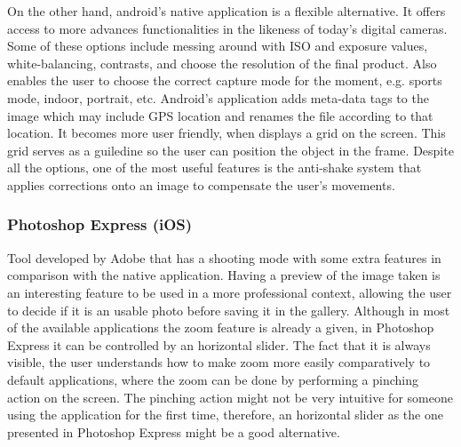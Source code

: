 On the other hand, android's native application is a flexible alternative. It offers access to more advances functionalities in the likeness of today's digital cameras.
Some of these options include messing around with ISO and exposure values, white-balancing, contrasts, and choose the resolution of the final product. Also enables the user to choose the correct capture mode for the moment, e.g. sports mode, indoor, portrait, etc.
Android's application adds meta-data tags to the image which may include GPS location and renames the file according to that location. It becomes more user friendly, when displays a grid on the screen. This grid serves as a guiledine so the user can position the object in the frame. Despite all the options, one of the most useful features is the anti-shake system that applies corrections onto an image to compensate the user's movements.





\subsubsection{Photoshop Express (iOS)}

Tool developed by Adobe \cite{Photoshop} that has a shooting mode with some extra features in comparison with the native application.
Having a preview of the image taken is an interesting feature to be used in a more professional context, allowing the user to decide if it is an usable photo before saving it in the gallery.
Although in most of the available applications the zoom feature is already a given, in Photoshop Express it can be controlled by an horizontal slider. The fact that it is always visible, the user understands how to make zoom more easily comparatively to default applications, where the zoom can be done by performing a pinching action on the screen. The pinching action might not be very intuitive for someone using the application for the first time, therefore, an horizontal slider as the one presented in Photoshop Express might be a good alternative.

